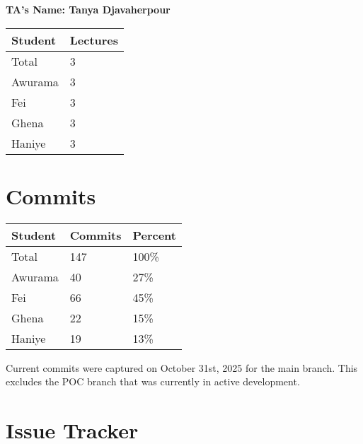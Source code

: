\documentclass{article}
\begin{document}

\noindent \textbf{TA's Name: Tanya Djavaherpour}

\begin{table}[H]
\centering
\begin{tabular}{ll}
\toprule
\textbf{Student} & \textbf{Lectures}\\
\midrule
Total & 3\\
Awurama & 3\\
Fei & 3\\
Ghena & 3\\
Haniye & 3\\
\bottomrule
\end{tabular}
\end{table}

\section{Commits}


\begin{table}[H]
\centering
\begin{tabular}{lll}
\toprule
\textbf{Student} & \textbf{Commits} & \textbf{Percent}\\
\midrule
Total & 147 & 100\% \\
Awurama & 40& 27\% \\
Fei & 66& 45\% \\
Ghena & 22& 15\% \\
Haniye & 19& 13\% \\
\bottomrule
\end{tabular}
\end{table}

Current commits were captured on October 31st, 2025 for the main branch. This excludes the POC branch that was currently in active development.
\section{Issue Tracker}

\end{document}

